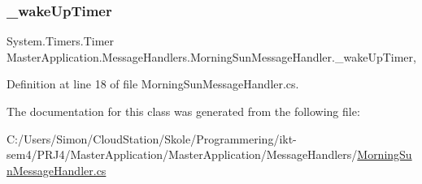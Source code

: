 \subsubsection{\texorpdfstring{\+\_\+wake\+Up\+Timer}{\_wakeUpTimer}}
{\footnotesize\ttfamily System.\+Timers.\+Timer Master\+Application.\+Message\+Handlers.\+Morning\+Sun\+Message\+Handler.\+\_\+wake\+Up\+Timer\hspace{0.3cm}{\ttfamily [static]}, {\ttfamily [private]}}



Definition at line 18 of file Morning\+Sun\+Message\+Handler.\+cs.



The documentation for this class was generated from the following file\+:\begin{DoxyCompactItemize}
\item 
C\+:/\+Users/\+Simon/\+Cloud\+Station/\+Skole/\+Programmering/ikt-\/sem4/\+P\+R\+J4/\+Master\+Application/\+Master\+Application/\+Message\+Handlers/\mbox{\hyperlink{_morning_sun_message_handler_8cs}{Morning\+Sun\+Message\+Handler.\+cs}}\end{DoxyCompactItemize}
